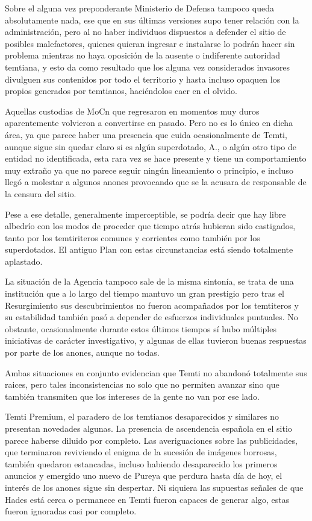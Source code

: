 \documentclass[
  spanish,
]{book}
\begin{document}
Sobre el alguna vez preponderante Ministerio de Defensa tampoco queda absolutamente nada, ese que en sus últimas versiones supo tener relación con la administración, pero al no haber individuos dispuestos a defender el sitio de posibles malefactores, quienes quieran ingresar e instalarse lo podrán hacer sin problema mientras no haya oposición de la ausente o indiferente autoridad temtiana, y esto da como resultado que los alguna vez considerados invasores divulguen sus contenidos por todo el territorio y hasta incluso opaquen los propios generados por temtianos, haciéndolos caer en el olvido.

Aquellas custodias de MoCn que regresaron en momentos muy duros aparentemente volvieron a convertirse en pasado. Pero no es lo único en dicha área, ya que parece haber una presencia que cuida ocasionalmente de Temti, aunque sigue sin quedar claro si es algún superdotado, A., o algún otro tipo de entidad no identificada, esta rara vez se hace presente y tiene un comportamiento muy extraño ya que no parece seguir ningún lineamiento o principio, e incluso llegó a molestar a algunos anones provocando que se la acusara de responsable de la censura del sitio.

Pese a ese detalle, generalmente imperceptible, se podría decir que hay libre albedrío con los modos de proceder que tiempo atrás hubieran sido castigados, tanto por los temtiriteros comunes y corrientes como también por los superdotados. El antiguo Plan con estas circunstancias está siendo totalmente aplastado.

La situación de la Agencia tampoco sale de la misma sintonía, se trata de una institución que a lo largo del tiempo mantuvo un gran prestigio pero tras el Resurgimiento sus descubrimientos no fueron acompañados por los temtiteros y su estabilidad también pasó a depender de esfuerzos individuales puntuales. No obstante, ocasionalmente durante estos últimos tiempos sí hubo múltiples iniciativas de carácter investigativo, y algunas de ellas tuvieron buenas respuestas por parte de los anones, aunque no todas.

Ambas situaciones en conjunto evidencian que Temti no abandonó totalmente sus raices, pero tales inconsistencias no solo que no permiten avanzar sino que también transmiten que los intereses de la gente no van por ese lado.

Temti Premium, el paradero de los temtianos desaparecidos y similares no presentan novedades algunas. La presencia de ascendencia española en el sitio parece haberse diluido por completo. Las averiguaciones sobre las publicidades, que terminaron reviviendo el enigma de la sucesión de imágenes borrosas, también quedaron estancadas, incluso habiendo desaparecido los primeros anuncios y emergido uno nuevo de Pureya que perdura hasta día de hoy, el interés de los anones sigue sin despertar. Ni siquiera las supuestas señales de que Hades está cerca o permanece en Temti fueron capaces de generar algo, estas fueron ignoradas casi por completo.
\end{document}
